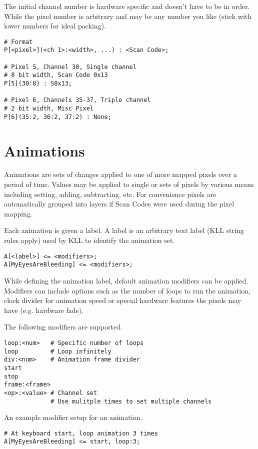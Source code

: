 \documentclass{kiibohd-template}
\begin{document}
The initial channel number is hardware specific and doesn't have to be in order.
While the pixel number is arbitrary and may be any number you like (stick with lower numbers for ideal packing).

\begin{lstlisting}
# Format
P[<pixel>](<ch 1>:<width>, ...) : <Scan Code>;

# Pixel 5, Channel 30, Single channel
# 8 bit width, Scan Code 0x13
P[5](30:8) : S0x13;

# Pixel 6, Channels 35-37, Triple channel
# 2 bit width, Misc Pixel
P[6](35:2, 36:2, 37:2) : None;
\end{lstlisting}


\section{Animations}
\label{sec:animations}

Animations are sets of changes applied to one of more mapped pixels over a period of time.
Values may be applied to single or sets of pixels by various means including setting, adding, subtracting, etc.
For convenience pixels are automatically grouped into layers if Scan Codes were used during the pixel mapping.

Each animation is given a label.
A label is an arbitrary text label (KLL string rules apply) used by KLL to identify the animation set.

\begin{lstlisting}
A[<label>] <= <modifiers>;
A[MyEyesAreBleeding] <= <modifiers>;
\end{lstlisting}

While defining the animation label, default animation modifiers can be applied.
Modifiers can include options such as the number of loops to run the animation, clock divider for animation speed or special hardware features the pixels may have (e.g. hardware fade).

The following modifiers are supported.

\begin{lstlisting}
loop:<num>   # Specific number of loops
loop         # Loop infinitely
div:<num>    # Animation frame divider
start
stop
frame:<frame>
<op>:<value> # Channel set
             # Use mulitple times to set multiple channels
\end{lstlisting}

An example modifier setup for an animation.

\begin{lstlisting}
# At keyboard start, loop animation 3 times
A[MyEyesAreBleeding] <= start, loop:3;
\end{lstlisting}
\end{document}

